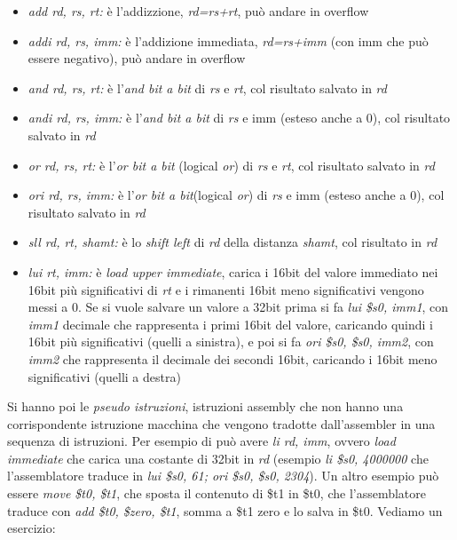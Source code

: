 \documentclass[a4paper,12pt, oneside]{book}
\begin{document}
\begin{itemize}
  \item \textit{add rd, rs, rt:} è l'addizzione, \textit{rd=rs+rt}, può andare in overflow
  \item \textit{addi rd, rs, imm:} è l'addizione immediata, \textit{rd=rs+imm} (con imm che può essere negativo), può andare in overflow
  \item \textit{and rd, rs, rt:} è l'\textit{and bit a bit} di \textit{rs} e \textit{rt}, col risultato salvato in \textit{rd}
  \item \textit{andi rd, rs, imm:} è l'\textit{and bit a bit} di \textit{rs} e imm (esteso anche a 0), col risultato salvato in \textit{rd}
  \item \textit{or rd, rs, rt:} è l'\textit{or bit a bit} (logical \textit{or}) di \textit{rs} e \textit{rt}, col risultato salvato in \textit{rd}
  \item \textit{ori rd, rs, imm:} è l'\textit{or bit a bit}(logical \textit{or}) di \textit{rs} e imm (esteso anche a 0), col risultato salvato in \textit{rd}
  \item \textit{sll rd, rt, shamt:} è lo \textit{shift left} di \textit{rd} della distanza \textit{shamt}, col risultato in \textit{rd}
  \item \textit{lui rt, imm:} è \textit{load upper immediate}, carica i 16bit del valore immediato nei 16bit più significativi di \textit{rt} e i rimanenti 16bit meno significativi vengono messi a 0. Se si vuole salvare un valore a 32bit prima si fa \textit{lui \$s0, imm1}, con \textit{imm1} decimale che rappresenta i primi 16bit del valore, caricando quindi i 16bit più significativi (quelli a sinistra), e poi si fa \textit{ori \$s0, \$s0, imm2}, con \textit{imm2} che rappresenta il decimale dei secondi 16bit, caricando i 16bit meno significativi (quelli a destra)
\end{itemize}
Si hanno poi le \textit{pseudo istruzioni}, istruzioni assembly che non hanno una corrispondente istruzione macchina che vengono tradotte dall'assembler in una sequenza di istruzioni. Per esempio di può avere \textit{li rd, imm}, ovvero \textit{load immediate} che carica una costante di 32bit in \textit{rd} (esempio \textit{li \$s0, 4000000} che l'assemblatore traduce in \textit{lui \$s0, 61; ori \$s0, \$s0, 2304}). Un altro esempio può essere \textit{move \$t0, \$t1}, che sposta il contenuto di \$t1 in \$t0, che l'assemblatore traduce con \textit{add \$t0, \$zero, \$t1}, somma a \$t1 zero e lo salva in \$t0.
Vediamo un esercizio:\\
\end{document}

